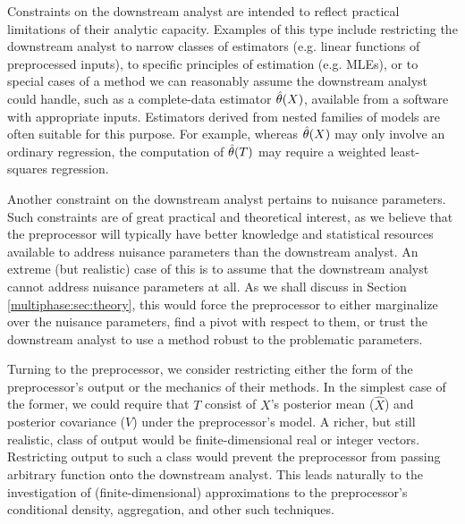 Constraints on the downstream analyst are intended to reflect practical limitations of their analytic capacity.
Examples of this type include restricting the downstream analyst to narrow classes of estimators (e.g. linear functions of preprocessed inputs), to specific principles of estimation (e.g. MLEs), or to special cases of a method we can reasonably assume the downstream analyst could handle, such as a complete-data estimator $\hat{\theta}(X)$, available from  a software with appropriate inputs.
Estimators derived from nested families of models are often suitable for this purpose.
For example, whereas $\hat{\theta}(X)$ may only involve an  ordinary  regression, the computation of  $\hat{\theta}(T)$ may require  a weighted least-squares regression.

Another constraint on the downstream analyst pertains to nuisance parameters.
Such constraints are of great practical and theoretical interest, as we believe that the preprocessor will typically have better knowledge and statistical resources available to address nuisance parameters than the downstream analyst.
An extreme (but realistic) case of this is to assume that the downstream analyst cannot address nuisance parameters at all.
As we shall discuss in Section \ref{multiphase:sec:theory}, this would force the preprocessor to either marginalize over the nuisance parameters, find a pivot with respect to them, or trust the downstream analyst to use a method robust to the problematic parameters.

Turning to the preprocessor, we consider restricting either the form of the preprocessor's output or the mechanics of their methods.
In the simplest case of the former, we could require that $T$ consist of $X$'s posterior mean ($\hat{X}$) and posterior covariance ($V$) under the preprocessor's model.
A richer, but still realistic, class of output would be finite-dimensional real or integer vectors.
Restricting output to such a class would prevent the preprocessor from passing arbitrary function onto the downstream analyst.
This leads naturally to the investigation of (finite-dimensional) approximations to the preprocessor's conditional density, aggregation, and other such techniques.

